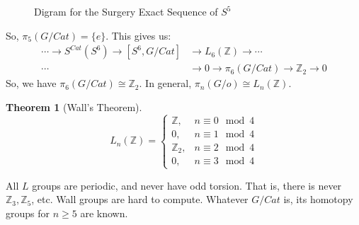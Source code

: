 \documentclass[oneside]{book}
\theoremstyle{mystyle}
\newtheorem{theorem}{Theorem}[section]
\begin{document}
\begin{figure}[H]
    \centering
    \caption[Surgery Theory - Diagram for Sequence of $S^{5}$]{Digram for the Surgery Exact Sequence of $S^{5}$}
    \label{fig:surgery_theory_example_diagram_for_surgery_exact_sequence}
\end{figure}
So, $\pi_{5}(G/Cat) = \{e\}$. This gives us:
\begin{align*}
    \cdots \rightarrow S^{Cat}(S^{6})\rightarrow [S^{6},G/Cat] &\rightarrow L_{6}(\mathbb{Z}) \rightarrow \cdots\\
    \cdots &\rightarrow 0 \rightarrow \pi_{6}(G/Cat) \rightarrow \mathbb{Z}_{2}\rightarrow 0
\end{align*}
So, we have $\pi_{6}(G/Cat) \cong \mathbb{Z}_{2}$. In general, $\pi_{n}(G/o) \cong L_{n}(\mathbb{Z})$.
\begin{theorem}[Wall's Theorem]
\begin{equation*}
    L_{n}(\mathbb{Z}) = \begin{cases} \mathbb{Z}, & n \equiv 0 \mod 4 \\ 0, & n \equiv 1 \mod 4 \\ \mathbb{Z}_{2}, & n \equiv 2 \mod 4 \\ 0, & n \equiv 3 \mod 4 \end{cases}
\end{equation*}
\end{theorem}
All $L$ groups are periodic, and never have odd torsion. That is, there is never $\mathbb{Z}_{3},\mathbb{Z}_{5}$, etc. Wall groups are hard to compute. Whatever $G/Cat$ is, its homotopy groups for $n\geq 5$ are known.
\end{document}
